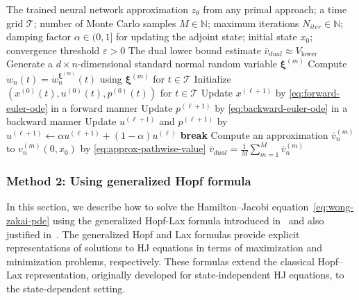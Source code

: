 \documentclass[11pt]{article}
\numberwithin{equation}{section}
\newcommand{\algorithmicbreak}{\textbf{break}}
\newcommand{\BREAK}{\STATE \algorithmicbreak}
\theoremstyle{plain}
\theoremstyle{definition}
\theoremstyle{remark}
\begin{document}
\begin{algorithm}[htbp!]
\caption{Computing the dual lower bound using Pontryagin's maximum principle}
\label{alg:dual-pontryagin}
\begin{algorithmic}[1]
\REQUIRE The trained neural network approximation $z_\theta$ from any primal approach; a time grid $\mathcal{T}$; number of Monte Carlo samples $M\in \mathbb{N}$; maximum iterations $N_{iter}\in \mathbb{N}$; damping factor $\alpha\in (0,1]$ for updating the adjoint state; initial state $x_0$; convergence threshold $\varepsilon>0$ 
\ENSURE The dual lower bound estimate $\bar{v}_{dual} \approx V_{\text{lower}}$ 
    \STATE Generate a $d\times n$-dimensional standard normal random variable $\bm{\xi}^{(m)}$ 
    \STATE Compute $\dot{w}_n(t) = \dot{w}_n^{\bm{\xi}^{(m)}}(t)$ using $\bm{\xi}^{(m)}$ for $t\in \mathcal{T}$ 
    \STATE Initialize $(x^{(0)}(t), u^{(0)}(t), p^{(0)}(t))$ for $t\in \mathcal{T}$ 
        \STATE Update $x^{(\ell+1)}$ by \eqref{eq:forward-euler-ode} in a forward manner
        \STATE Update $p^{(\ell+1)}$ by \eqref{eq:backward-euler-ode} in a backward manner
        \STATE Update $u^{(\ell+1)}$ and $p^{(\ell+1)}$ by $u^{(\ell+1)} \leftarrow \alpha u^{(\ell+1)} + (1-\alpha)u^{(\ell)}$ 
        \BREAK 
        \ENDIF
    \ENDFOR
    \STATE Compute an approximation $\bar{v}_n^{(m)}$ to $v_n^{(m)}(0,x_0)$ by \eqref{eq:approx-pathwise-value} 
\ENDFOR
\RETURN $\bar{v}_{dual} = \frac{1}{M}\sum_{m=1}^M \bar{v}_n^{(m)}$ 
\end{algorithmic}
\end{algorithm}

\subsubsection{Method 2: Using generalized Hopf formula} \label{sec:hopf-method}
In this section, we describe how to solve the Hamilton--Jacobi equation~\eqref{eq:wong-zakai-pde} using the generalized Hopf-Lax formula introduced in~\cite{chow2019algorithm} and also justified in~\cite{yegorov2021perspectives}. The generalized Hopf and Lax formulas provide explicit representations of solutions to HJ equations in terms of maximization and minimization problems, respectively. These formulas extend the classical Hopf–Lax representation, originally developed for state-independent HJ equations, to the state-dependent setting.
\end{document}
